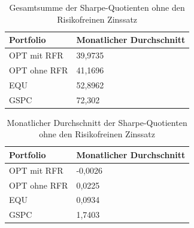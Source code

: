 \documentclass[12pt]{article}
\begin{document}
  
                
        \begin{table}[htp]
            \begin{center}
                
                \begin{tabular}{ | l | l | }

                    \hline
                    \textbf{Portfolio}   & \textbf{Monatlicher Durchschnitt} \\
                    \hline
                    OPT mit RFR          & 39,9735  \\          
                    OPT ohne RFR         & 41,1696 \\
                    EQU                  & 52,8962  \\              
                    GSPC                 & 72,302  \\       
                            
                    \hline

                \end{tabular}
                \caption{Gesamtsumme der Sharpe-Quotienten ohne den Risikofreinen Zinssatz}
                \label{gs-sq-ohne-rfz}

            \end{center}
        \end{table}

        \begin{table}[htp]
            \begin{center}
                
                \begin{tabular}{ | l | l | }

                    \hline
                    \textbf{Portfolio}   & \textbf{Monatlicher Durchschnitt} \\
                    \hline
                    OPT mit RFR          & -0,0026 \\      
                    OPT ohne RFR         & 0,0225 \\
                    EQU                  & 0,0934 \\            
                    GSPC                 & 1,7403 \\     
                            
                    \hline

                \end{tabular}
                \caption{Monatlicher Durchschnitt der Sharpe-Quotienten ohne den Risikofreinen Zinssatz}
                \label{md-sq-ohne-rfz}

            \end{center}
        \end{table}
\end{document}
